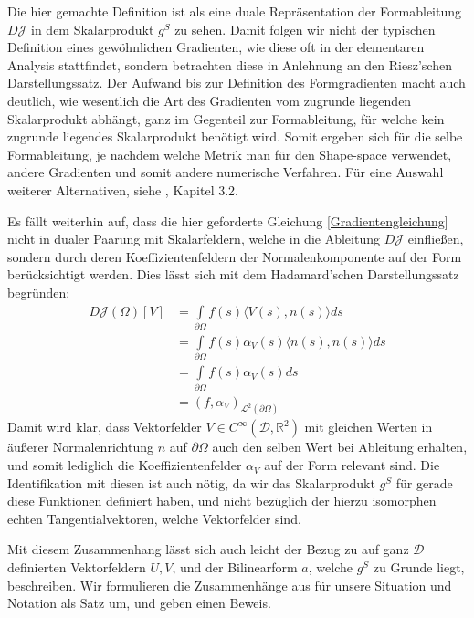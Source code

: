 Die hier gemachte Definition ist als eine duale Repräsentation der Formableitung $D\mathcal{J}$ in dem Skalarprodukt $g^S$ zu sehen. Damit folgen wir nicht der typischen Definition eines gewöhnlichen Gradienten, wie diese oft in der elementaren Analysis stattfindet, sondern betrachten diese in Anlehnung an den  Riesz'schen Darstellungssatz. Der Aufwand bis zur Definition des Formgradienten macht auch deutlich, wie wesentlich die Art des Gradienten vom zugrunde liegenden Skalarprodukt abhängt, ganz im Gegenteil zur Formableitung, für welche kein zugrunde liegendes Skalarprodukt benötigt wird. Somit ergeben sich für die selbe Formableitung, je nachdem welche Metrik man für den Shape-space verwendet, andere Gradienten und somit andere numerische Verfahren. Für eine Auswahl weiterer Alternativen, siehe \cite{shape_space}, Kapitel 3.2.

Es fällt weiterhin auf, dass die hier geforderte Gleichung \ref{Gradientengleichung} nicht in dualer Paarung mit Skalarfeldern, welche in die Ableitung $D\mathcal{J}$ einfließen, sondern durch deren Koeffizientenfeldern der Normalenkomponente auf der Form berücksichtigt werden. Dies lässt sich mit dem Hadamard'schen Darstellungssatz begründen:
\begin{align*}
	D\mathcal{J}(\Omega)[V] &= \underset{\partial\Omega}{\int}f(s)\langle V(s),n(s)\rangle ds \\
	&=\underset{\partial\Omega}{\int}f(s) \alpha_V(s)\langle n(s),n(s)\rangle ds \\
	&=\underset{\partial\Omega}{\int}f(s) \alpha_V(s) ds \\
	&= (f,\alpha_V)_{\mathcal{L}^2(\partial\Omega)}
\end{align*}
Damit wird klar, dass Vektorfelder $V\in C^\infty(\mathcal{D},\mathbb{R}^2)$ mit gleichen Werten in äußerer Normalenrichtung $n$ auf $\partial\Omega$ auch den selben Wert bei Ableitung erhalten, und somit lediglich die Koeffizientenfelder $\alpha_V$ auf der Form relevant sind. Die Identifikation mit diesen ist auch nötig, da wir das Skalarprodukt $g^S$ für gerade diese Funktionen definiert haben, und nicht bezüglich der hierzu isomorphen echten Tangentialvektoren, welche Vektorfelder sind.

Mit diesem Zusammenhang lässt sich auch leicht der Bezug zu auf ganz $\mathcal{D}$ definierten Vektorfeldern $U,V$, und der Bilinearform $a$, welche $g^S$ zu Grunde liegt, beschreiben. Wir formulieren die Zusammenhänge aus \cite{bfgs2} für unsere Situation und Notation als Satz um, und geben einen Beweis. 

